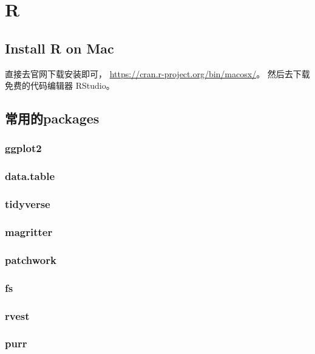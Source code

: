 \chapter{R}

\section{Install R on Mac}
直接去官网下载安装即可， \url{https://cran.r-project.org/bin/macosx/}。
然后去下载免费的代码编辑器 RStudio。

\section{常用的packages}

\subsection{ggplot2}
\subsection{data.table}
\subsection{tidyverse}
\subsection{magritter}
\subsection{patchwork}
\subsection{fs}
\subsection{rvest}
\subsection{purr}
